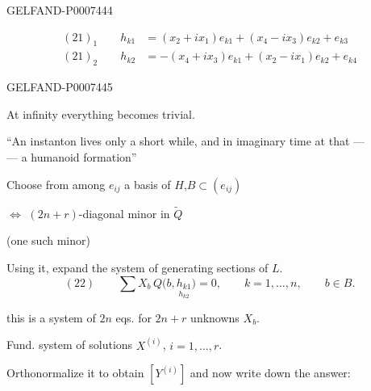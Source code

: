 \begin{GelfandAdjacentEvidence}{GELFAND-P000744}{4}


\begin{align*}
(21)_1\qquad h_{k1}&=(x_2+ix_1)e_{k1}+(x_4-ix_3)e_{k2}+e_{k3}\\
(21)_2\qquad h_{k2}&=-(x_4+ix_3)e_{k1}+(x_2-ix_1)e_{k2}+e_{k4}
\end{align*}

\end{GelfandAdjacentEvidence}
\begin{GelfandAdjacentEvidence}{GELFAND-P000744}{5}


At infinity everything becomes trivial.

“An instanton lives only a short while, and in imaginary time at that ---\\
--- a humanoid formation”

Choose from among \(e_{ij}\) a basis of \(H\),\qquad \(B\subset(e_{ij})\)

\(\Leftrightarrow\) \((2n+r)\)-diagonal minor in \(\widetilde Q\)

(one such minor)

Using it, expand the system of generating sections of \(L\).
\[
(22)\qquad \sum X_b\,Q\bigl(b,\underset{h_{k2}}{h_{k1}}\bigr)=0,\qquad
k=1,\ldots,n,\qquad b\in B.
\]
\end{GelfandAdjacentEvidence}


this is a system of \(2n\) eqs. for \(2n+r\) unknowns \(X_b\).

Fund. system of solutions \(X^{(i)}\), \(i=1,\ldots,r\).

Orthonormalize it to obtain \([Y^{(i)}]\) and now write down the answer:


